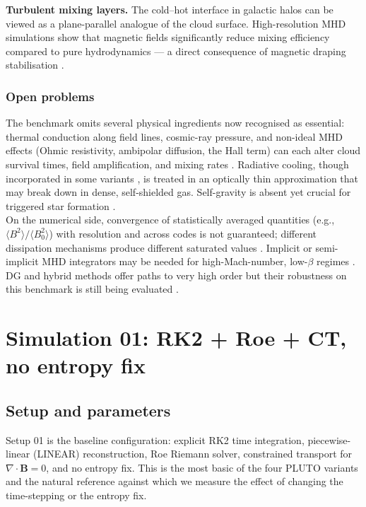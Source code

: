 \documentclass[11pt,a4paper]{article}
\begin{document}
\textbf{Turbulent mixing layers.} The cold--hot interface in galactic halos can be viewed as a plane-parallel analogue of the cloud surface. High-resolution MHD simulations show that magnetic fields significantly reduce mixing efficiency compared to pure hydrodynamics --- a direct consequence of magnetic draping stabilisation \cite{fielding2020, gregori2000, shin2008}.

\subsubsection{Open problems}

The benchmark omits several physical ingredients now recognised as essential: thermal conduction along field lines, cosmic-ray pressure, and non-ideal MHD effects (Ohmic resistivity, ambipolar diffusion, the Hall term) can each alter cloud survival times, field amplification, and mixing rates \cite{mccourt2015, fielding2022, ruszkowski2017}. Radiative cooling, though incorporated in some variants \cite{shin2008, gronnow2017}, is treated in an optically thin approximation that may break down in dense, self-shielded gas. Self-gravity is absent yet crucial for triggered star formation \cite{inoue2013}.
\\

On the numerical side, convergence of statistically averaged quantities (e.g., $\langle B^2\rangle / \langle B_0^2\rangle$) with resolution and across codes is not guaranteed; different dissipation mechanisms produce different saturated values \cite{gregori2000, miniati1999}. Implicit or semi-implicit MHD integrators may be needed for high-Mach-number, low-$\beta$ regimes \cite{osullivan2007}. DG and hybrid methods offer paths to very high order but their robustness on this benchmark is still being evaluated \cite{balsara2017}.

\section{Simulation 01: RK2 + Roe + CT, no entropy fix}
\label{sec:sim-01}

\subsection{Setup and parameters}

Setup 01 is the baseline configuration: explicit RK2 time integration, piecewise-linear (LINEAR) reconstruction, Roe Riemann solver, constrained transport for $\nabla\!\cdot\!\mathbf{B}=0$, and no entropy fix. This is the most basic of the four PLUTO variants and the natural reference against which we measure the effect of changing the time-stepping or the entropy fix.
\end{document}
